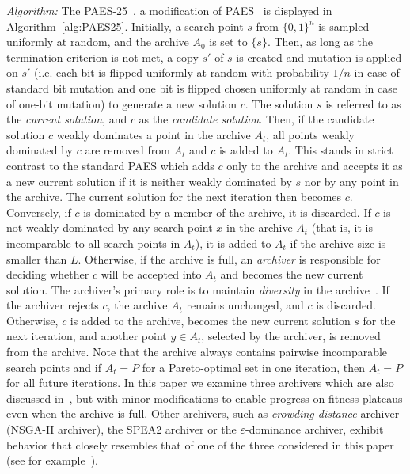 \documentclass[
sigconf = false, %
review = false, %
screen = true, %
anonymous = true, %
format=acmsmall
]{acmart}
\newcommand{\PAES}{PAES-25\xspace}
\begin{document}
\emph{Algorithm:} The \PAES~\cite{Knowles2025}, a modification of PAES~\cite{781913,Knowles2000} is displayed in Algorithm~\ref{alg:PAES25}. Initially, a search point $s$ from $\{0,1\}^n$ is sampled uniformly at random, and the archive $A_0$ is set to $\{s\}$. Then, as long as the termination criterion is not met, a copy $s'$ of $s$ is created and mutation is applied on $s'$ (i.e. each bit is flipped uniformly at random with probability $1/n$ in case of standard bit mutation and one bit is flipped chosen uniformly at random in case of one-bit mutation) to generate a new solution $c$. The solution $s$ is referred to as the \emph{current solution}, and $c$ as the \emph{candidate solution}. Then, if the candidate solution $c$ weakly dominates a point in the archive $A_t$, all points weakly dominated by $c$ are removed from $A_t$ and $c$ is added to $A_t$. This stands in strict contrast to the standard PAES which adds $c$ only to the archive and accepts it as a new current solution if it is neither weakly dominated by $s$ nor by any point in the archive. The current solution for the next iteration then becomes $c$. Conversely, if $c$ is dominated by a member of the archive, it is discarded. If $c$ is not weakly dominated by any search point $x$ in the archive $A_t$ (that is, it is incomparable to all search points in $A_t$), it is added to $A_t$ if the archive size is smaller than $L$. Otherwise, if the archive is full, an \emph{archiver} is responsible for deciding whether $c$ will be accepted into $A_t$ and becomes the new current solution. The archiver's primary role is to maintain \emph{diversity} in the archive~\cite{Knowles2025}. If the archiver rejects $c$, the archive $A_t$ remains unchanged, and $c$ is discarded. Otherwise, $c$ is added to the archive, becomes the new current solution $s$ for the next iteration, and another point $y \in A_t$, selected by the archiver, is removed from the archive. Note that the archive always contains pairwise incomparable search points and if $A_t=P$ for a Pareto-optimal set in one iteration, then $A_t=P$ for all future iterations. In this paper we examine three archivers which are also discussed in~\citet{Knowles2025}, but with minor modifications to enable progress on fitness plateaus even when the archive is full. Other archivers, such as \emph{crowding distance} archiver (NSGA-II archiver), the SPEA2 archiver or the $\varepsilon$-dominance archiver, exhibit behavior that closely resembles that of one of the three considered in this paper (see for example~\cite{Archiver2011}).
\end{document}

